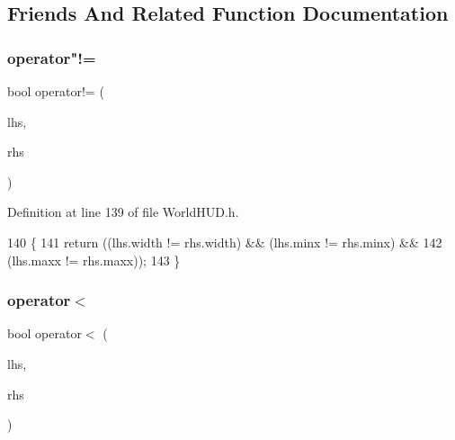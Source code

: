 \subsection{Friends And Related Function Documentation}
\mbox{\label{structnjli_1_1_j_l_i_text_row_a23fb4aef4a3336830ac13966d757cc33}} 
\subsubsection{\texorpdfstring{operator"!=}{operator!=}}
{\footnotesize\ttfamily bool operator!= (\begin{DoxyParamCaption}\item[{const \mbox{\hyperlink{structnjli_1_1_j_l_i_text_row}{J\+L\+I\+Text\+Row}} \&}]{lhs,  }\item[{const \mbox{\hyperlink{structnjli_1_1_j_l_i_text_row}{J\+L\+I\+Text\+Row}} \&}]{rhs }\end{DoxyParamCaption})\hspace{0.3cm}{\ttfamily [friend]}}



Definition at line 139 of file World\+H\+U\+D.\+h.


\begin{DoxyCode}
140     \{
141       \textcolor{keywordflow}{return} ((lhs.width != rhs.width) && (lhs.minx != rhs.minx) &&
142               (lhs.maxx != rhs.maxx));
143     \}
\end{DoxyCode}
\mbox{\label{structnjli_1_1_j_l_i_text_row_a8cebc5909fc78b73ff12cfcf8163fc42}} 
\subsubsection{\texorpdfstring{operator$<$}{operator<}}
{\footnotesize\ttfamily bool operator$<$ (\begin{DoxyParamCaption}\item[{const \mbox{\hyperlink{structnjli_1_1_j_l_i_text_row}{J\+L\+I\+Text\+Row}} \&}]{lhs,  }\item[{const \mbox{\hyperlink{structnjli_1_1_j_l_i_text_row}{J\+L\+I\+Text\+Row}} \&}]{rhs }\end{DoxyParamCaption})\hspace{0.3cm}{\ttfamily [friend]}}




